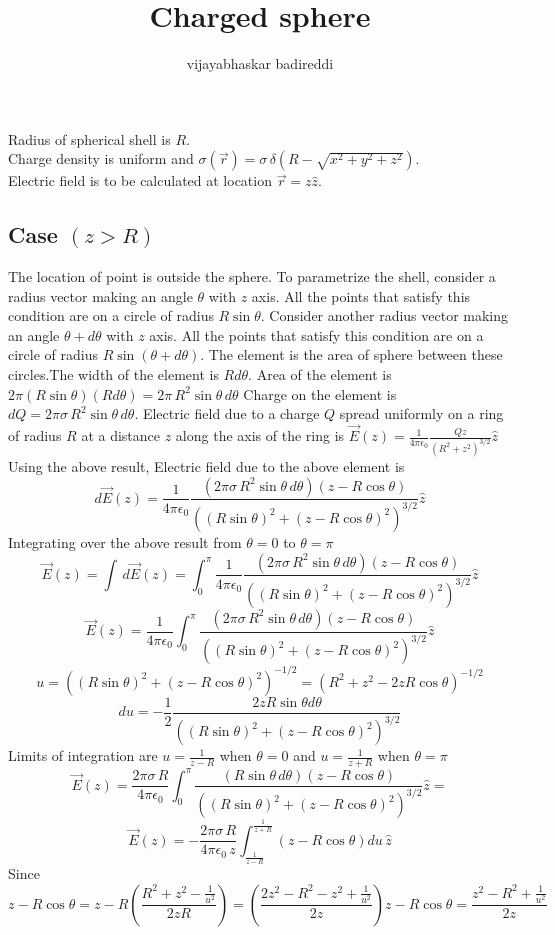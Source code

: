 \documentclass[12pt]{article}
\title{Charged sphere}
\author{vijayabhaskar badireddi}
\begin{document}
Radius of spherical shell is $R$.\\
Charge density is uniform  and $\sigma(\vec{r})=\sigma\,\delta\left(R-\sqrt{x^2+y^2+z^2}\right)$.\\
Electric field is to be calculated at location $\vec{r}=z\hat{z}$.
\subsection*{Case $(z>R)$} 
The location of point is outside the sphere.
To parametrize the shell, consider a radius vector making an angle $\theta$ with $z$ axis. All the points that satisfy this condition are on a circle of radius $R\sin{\theta}$. Consider another radius vector making an angle $\theta+d\theta$ with $z$ axis. All the points that satisfy this condition are on a circle of radius $R\sin{(\theta+d\theta)}$. The element is the area of sphere between these circles.The width of the element is $Rd\theta$. Area of the element is $2\pi(R\sin{\theta})(Rd\theta)=2\pi\,R^2\sin{\theta}\,d\theta$
Charge on the element is $dQ=2\pi\sigma\,R^2\sin{\theta}\,d\theta$.
Electric field due to a charge $Q$ spread uniformly on a ring of radius $R$ at a distance $z$ along the axis of the ring is $\vec{E}(z)=\frac{1}{4\pi\epsilon_0}\frac{Qz}{(R^2+z^2)^{3/2}}\hat{z}$
Using the above result,
Electric field due to the above element is $$d\vec{E}(z)=\frac{1}{4\pi\epsilon_0}\frac{(2\pi\sigma\,R^2\sin{\theta}\,d\theta)(z-R\cos{\theta})}{((R\sin{\theta})^2+(z-R\cos{\theta})^2)^{3/2}}\hat{z}$$
Integrating over the above result from $\theta=0$ to $\theta=\pi$
$$\vec{E}(z)=\int\,d\vec{E}(z)=\int_{0}^{\pi}\frac{1}{4\pi\epsilon_0}\frac{(2\pi\sigma\,R^2\sin{\theta}\,d\theta)(z-R\cos{\theta})}{((R\sin{\theta})^2+(z-R\cos{\theta})^2)^{3/2}}\hat{z}$$
$$\vec{E}(z)=\frac{1}{4\pi\epsilon_0}\int_{0}^{\pi}\frac{(2\pi\sigma\,R^2\sin{\theta}\,d\theta)(z-R\cos{\theta})}{((R\sin{\theta})^2+(z-R\cos{\theta})^2)^{3/2}}\hat{z}$$
$$u=((R\sin{\theta})^2+(z-R\cos{\theta})^2)^{-1/2}=(R^2+z^2-2zR\cos{\theta})^{-1/2}$$
$$du=-\frac{1}{2}\frac{2zR\sin{\theta}d{\theta}}{((R\sin{\theta})^2+(z-R\cos{\theta})^2)^{3/2}}$$
Limits of integration are $u=\frac{1}{z-R}$ when $\theta=0$ and $u=\frac{1}{z+R}$ when $\theta=\pi$
$$\vec{E}(z)=\frac{2\pi\sigma\,R}{4\pi\epsilon_0}\int_{0}^{\pi}\frac{(R\sin{\theta}\,d\theta)(z-R\cos{\theta})}{((R\sin{\theta})^2+(z-R\cos{\theta})^2)^{3/2}}\hat{z}=
$$
$$\vec{E}(z)=-\frac{2\pi\sigma\,R}{4\pi\epsilon_0\,z}\int_{\frac{1}{z-R}}^{\frac{1}{z+R}}(z-R\cos{\theta})du\,\hat{z}$$
Since $$z-R\cos{\theta}=z-R\left(\frac{R^2+z^2-\frac{1}{u^2}}{2zR} \right )=\left(\frac{2z^2-R^2-z^2+\frac{1}{u^2}}{2z} \right )z-R\cos{\theta}=\frac{z^2-R^2+\frac{1}{u^2}}{2z}$$
\end{document}
